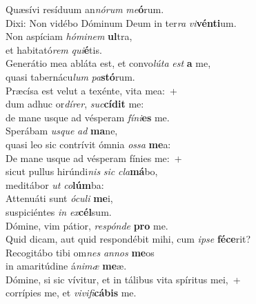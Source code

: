 \evenverse Quæsívi resíduum an\textit{nó}\textit{rum} \textit{me}\textbf{ó}rum.~\*\\
\evenverse Dixi: Non vidébo Dóminum Deum in ter\textit{ra} \textit{vi}\textbf{vén}\textbf{ti}um.\\
\oddverse Non aspíciam \textit{hó}\textit{mi}\textit{nem} \textbf{ul}tra,~\*\\
\oddverse et habitató\textit{rem} \textit{qui}\textbf{é}tis.\\
\evenverse Generátio mea abláta est, et convo\textit{lú}\textit{ta} \textit{est} \textbf{a} me,~\*\\
\evenverse quasi tabernácu\textit{lum} \textit{pa}\textbf{stó}rum.\\
\oddverse Præcísa est velut a texénte, vita mea:~+\\
\oddverse  dum adhuc or\textit{dí}\textit{rer}, \textit{suc}\textbf{cí}\textbf{dit} me:~\*\\
\oddverse de mane usque ad vésperam \textit{fí}\textit{ni}\textbf{es} me.\\
\evenverse Sperábam \textit{us}\textit{que} \textit{ad} \textbf{ma}ne,~\*\\
\evenverse quasi leo sic contrívit ómnia \textit{os}\textit{sa} \textbf{me}a:\\
\oddverse De mane usque ad vésperam fínies me:~+\\
\oddverse  sicut pullus hirúndi\textit{nis} \textit{sic} \textit{cla}\textbf{má}bo,~\*\\
\oddverse meditábor \textit{ut} \textit{co}\textbf{lúm}ba:\\
\evenverse Attenuáti sunt \textit{ó}\textit{cu}\textit{li} \textbf{me}i,~\*\\
\evenverse suspiciéntes \textit{in} \textit{ex}\textbf{cél}sum.\\
\oddverse Dómine, vim pátior, \textit{re}\textit{spón}\textit{de} \textbf{pro} me.~\*\\
\oddverse Quid dicam, aut quid respondébit mihi, cum \textit{i}\textit{pse} \textbf{fé}\textbf{ce}rit?\\
\evenverse Recogitábo tibi om\textit{nes} \textit{an}\textit{nos} \textbf{me}os~\*\\
\evenverse in amaritúdine á\textit{ni}\textit{mæ} \textbf{me}æ.\\
\oddverse Dómine, si sic vívitur, et in tálibus vita spíritus mei,~+\\
\oddverse  corrípies me, et \textit{vi}\textit{vi}\textit{fi}\textbf{cá}\textbf{bis} me.~\*\\
